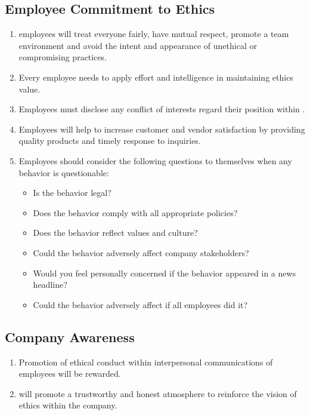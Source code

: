 \subsection{Employee Commitment to Ethics}
\begin{enumerate}
\item 
\CompanyName{} employees will treat everyone fairly, have mutual respect, promote a team environment and avoid the intent and appearance of unethical or compromising practices.
\item 
Every employee needs to apply effort and intelligence in maintaining ethics value.
\item 
Employees must disclose any conflict of interests regard their position within \CompanyName{}.
\item 
Employees will help \CompanyName{} to increase customer and vendor satisfaction by providing quality products and timely response to inquiries.
\item 
Employees should consider the following questions to themselves when any behavior is questionable:
\begin{itemize}
\item 
Is the behavior legal?
\item 
Does the behavior comply with all appropriate \CompanyName{} policies?
\item 
Does the behavior reflect \CompanyName{} values and culture?
\item 
Could the behavior adversely affect company stakeholders?
\item 
Would you feel personally concerned if the behavior appeared in a news headline?
\item 
Could the behavior adversely affect \CompanyName{} if all employees did it?
\end{itemize}
\end{enumerate}
\subsection{Company Awareness}
\begin{enumerate}
\item 
Promotion of ethical conduct within interpersonal communications of employees will be rewarded.
\item 
\CompanyName{} will promote a trustworthy and honest atmosphere to reinforce the vision of ethics within the company.
\end{enumerate}
